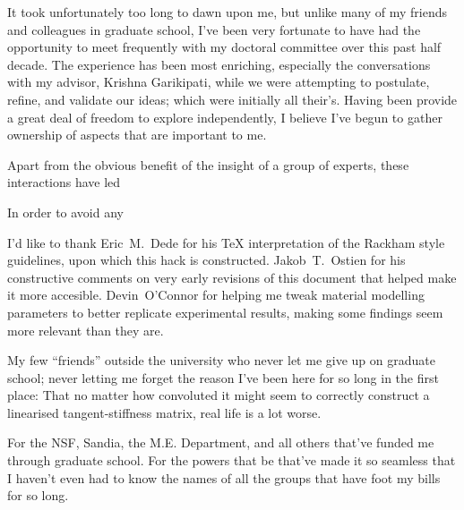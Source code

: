 \startacknowledgementspage
{
  It took unfortunately too long to dawn upon me, but unlike many of
  my friends and colleagues in graduate school, I've been very
  fortunate to have had the opportunity to meet frequently with my
  doctoral committee over this past half decade.
  The experience has been most enriching, especially
  the conversations with my advisor, Krishna Garikipati, while we were
  attempting to postulate, refine, and validate our ideas; which were
  initially all their's. Having been provide a great deal of freedom
  to explore independently, I believe I've begun to gather ownership
  of aspects that are important to me.

  Apart from the obvious benefit of the insight of a group of experts,
  these interactions have led 

  In order to avoid any 

  I'd like to thank Eric~M.~Dede for his TeX interpretation of the
  Rackham style guidelines, upon which this hack is
  constructed. Jakob~T.~Ostien for his constructive comments on very
  early revisions of this document that helped make it more
  accesible. Devin~O'Connor for helping me tweak material modelling
  parameters to better replicate experimental results, making some
  findings seem more relevant than they are.

  My few ``friends'' outside the university who never let me give up
  on graduate school; never letting me forget the reason I've been
  here for so long in the  first place: That no matter how convoluted it
  might seem to correctly construct a linearised tangent-stiffness
  matrix, real life is a lot worse.

  For the NSF, Sandia, the M.E. Department, and all others that've
  funded me through graduate school. For the powers that be that've
  made it so seamless that I haven't even had to know the names of all
  the groups that have foot my bills for so long.
}

\tableofcontents
\listoffigures
\listoftables
\listofappendices

\let\footnotesize=\small

%

